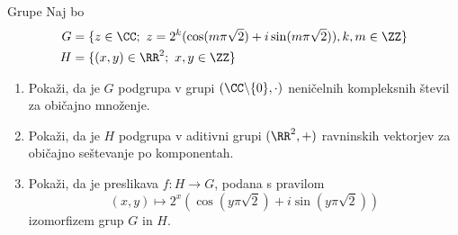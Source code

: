 \begin{frame}{Grupe}
	Naj bo
	\begin{align*}
	G &= \{z \in \CC;~z=2^k(\cos(m\pi\sqrt{2}) + i \sin(m\pi\sqrt{2})),k,m \in \ZZ \} \\
	H &= \{(x,y) \in \RR^2;~x,y \in \ZZ \}	
	\end{align*}

	\begin{enumerate}
		\item
			Pokaži, da je $G$ podgrupa v grupi $(\CC \backslash \{0\},\cdot)$
			neničelnih kompleksnih števil za običajno množenje.
		\item
			Pokaži, da je $H$ podgrupa v aditivni grupi $(\RR^2,+)$
			ravninskih vektorjev za običajno seštevanje po komponentah.
		\item
			Pokaži, da je preslikava $f:H\to G$, podana s pravilom
			$$
			(x,y) \mapsto 2^x(\cos(y \pi \sqrt{2}) + i \sin(y \pi \sqrt{2}))
			$$
			izomorfizem grup $G$ in $H$.
	\end{enumerate}
\end{frame}

